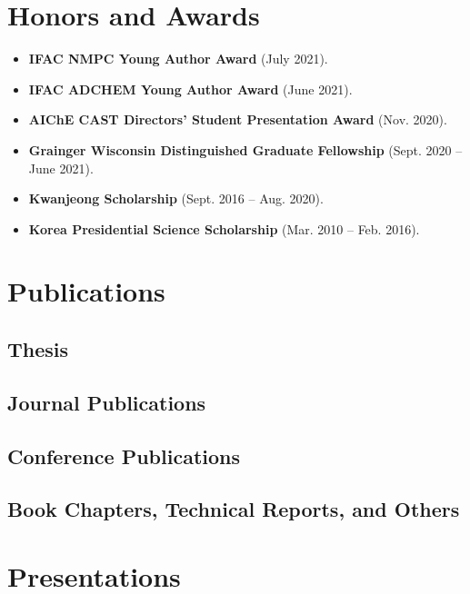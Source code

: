\documentclass{article}
\begin{document}
\section*{Honors and Awards}
\begin{itemize}[leftmargin=*]
\item[] {\bf IFAC NMPC Young Author Award} (July 2021).
\item[] {\bf IFAC ADCHEM Young Author Award} (June 2021).
\item[] {\bf AIChE CAST Directors' Student Presentation Award} (Nov. 2020).
\item[] {\bf Grainger Wisconsin Distinguished Graduate Fellowship} (Sept. 2020 -- June 2021).
\item[] {\bf Kwanjeong Scholarship} (Sept. 2016 -- Aug. 2020).
\item[] {\bf Korea Presidential Science Scholarship} (Mar. 2010 -- Feb. 2016).
\end{itemize}

\section*{Publications}
\subsection*{Thesis}
\renewcommand*{\labelenumi}{[T\theenumi]}
\subsection*{Journal Publications}
\renewcommand*{\labelenumi}{[J\theenumi]}
\subsection*{Conference Publications}
\renewcommand*{\labelenumi}{[C\theenumi]}
\subsection*{Book Chapters, Technical Reports, and Others}
\renewcommand*{\labelenumi}{[B\theenumi]}

\section*{Presentations}
\end{document}
